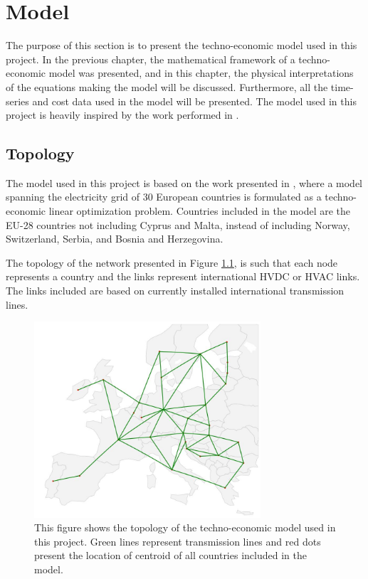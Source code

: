 
\chapter{Model}\label{chap:model}

The purpose of this section is to present the techno-economic model used in this project. In the previous chapter, the mathematical framework of a techno-economic model was presented, and in this chapter, the physical interpretations of the equations making the model will be discussed. Furthermore, all the time-series and cost data used in the model will be presented. The model used in this project is heavily inspired by the work performed in \cite{PyPSA_euro_30_model}. 

\section{Topology}
The model used in this project is based on the work presented in \cite{PyPSA_euro_30_model}, where a model spanning the electricity grid of 30 European countries is formulated as a techno-economic linear optimization problem. Countries included in the model are the EU-28 countries not including Cyprus and Malta, instead of including Norway, Switzerland, Serbia, and Bosnia and Herzegovina.

The topology of the network presented in Figure \ref{fig:network_lay}, is such that each node represents a country and the links represent international HVDC or HVAC links. The links included are based on currently installed international transmission lines. 


\begin{figure}[h]\centering
	\includegraphics[width=0.75\textwidth]{./Images/network_layout}
	\caption{This figure shows the topology of the techno-economic model used in this project. Green lines represent transmission lines and red dots present the location of centroid of all countries included in the model.}
	\label{fig:network_lay}
\end{figure}


